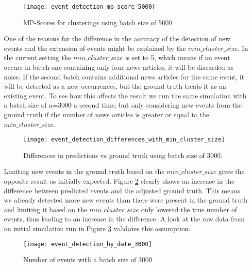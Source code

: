 \begin{figure}[h]
    \centering
    \texttt{[image: event\_detection\_mp\_score\_5000]}
    \caption{MP-Scores for clusterings using batch size of 5000}
    \label{fig:event_detection_mp_score_5000}
\end{figure}

One of the reasons for the difference in the accuracy of the detection of new events and the extension of events might be explained by the $min\_cluster\_size$. In the current setting the $min\_cluster\_size$ is set to 5, which means if an event occurs in batch one containing only four news articles, it will be discarded as noise. If the second batch contains additional news articles for the same event, it will be detected as a new occurrences, but the ground truth treats it as an existing event. To see how this affects the result we run the same simulation with a batch size of n=3000 a second time, but only considering new events from the ground truth if the number of news articles is greater or equal to the $min\_cluster\_size$.

\begin{figure}[h]
    \centering
    \texttt{[image: event\_detection\_differences\_with\_min\_cluster\_size]}
    \caption{Differences in predictions vs ground truth using batch size of 3000.}
    \label{fig:event_detection_differences_with_min_cluster_size}
\end{figure}

Limiting new events in the ground truth based on the $min\_cluster\_size$ gives the opposite result as initially expected. 
Figure \ref{fig:event_detection_differences_with_min_cluster_size} clearly shows an increase in the difference between predicted events and the adjusted ground truth. This means we already detected more new events than there were present in the ground truth and limiting it based on the $min\_cluster\_size$ only lowered the true number of events, thus leading to an increase in the difference. A look at the raw data from an initial simulation run in Figure \ref{fig:event_detection_by_date_3000} validates this assumption.

\begin{figure}[h]
    \centering
    \texttt{[image: event\_detection\_by\_date\_3000]}
    \caption{Number of events with a batch size of 3000}
    \label{fig:event_detection_by_date_3000}
\end{figure}

